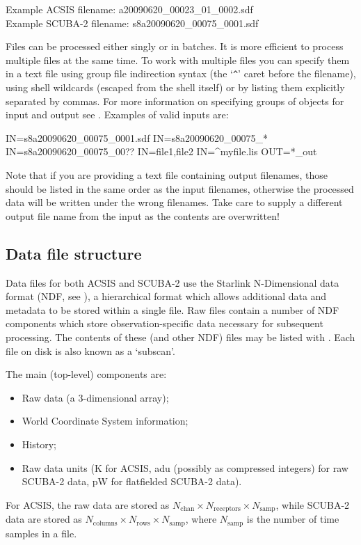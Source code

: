\documentclass[oneside,11pt]{starlink}
\begin{document}
Example ACSIS filename: a20090620\_00023\_01\_0002.sdf\\
Example SCUBA-2 filename: s8a20090620\_00075\_0001.sdf

Files can be processed either singly or in batches. It is more
efficient to process multiple files at the same time. To work with
multiple files you can specify them in a text file using group file
indirection syntax (the `\verb+^+' caret before the filename), using shell
wildcards (escaped from the shell itself) or by listing them
explicitly separated by commas. For more information on specifying
groups of objects for input and output see . Examples of valid inputs are:
\begin{terminalv}
IN=s8a20090620_00075_0001.sdf
IN=s8a20090620_00075_*
IN=s8a20090620_00075_00??
IN=file1,file2
IN=^myfile.lis
OUT=*_out
\end{terminalv}

Note that if you are providing a text file containing output
filenames, those should be listed in the same order as the input
filenames, otherwise the processed data will be written under
the wrong filenames. Take care to supply a different output file name
from the input as the contents are overwritten!

\subsection{Data file structure}

Data files for both ACSIS and SCUBA-2 \cite{sc2ic01} use the Starlink N-Dimensional
data format (NDF, see \ndfref), a hierarchical format which allows
additional data and metadata to be stored within a single file. Raw
files contain a number of NDF components which store
observation-specific data necessary for subsequent processing. The
contents of these (and other NDF) files may be listed with
\HDSTRACEref. Each file on disk is also known as a `subscan'.

The main (top-level) components are:
\begin{itemize}
\item Raw data (a 3-dimensional array);
\item World Coordinate System information;
\item History;
\item Raw data units (K for ACSIS, adu (possibly as compressed integers) for raw SCUBA-2 data,
  pW for flatfielded SCUBA-2 data).
\end{itemize}
For ACSIS, the raw data are stored as $N_{\textrm{chan}} \times N_{\textrm{receptors}} \times N_{\textrm{samp}}$, while SCUBA-2 data are stored as
$N_{\textrm{columns}} \times N_{\textrm{rows}} \times N_{\textrm{samp}}$, where
$N_{\textrm{samp}}$ is the number of time samples in a file.
\end{document}
